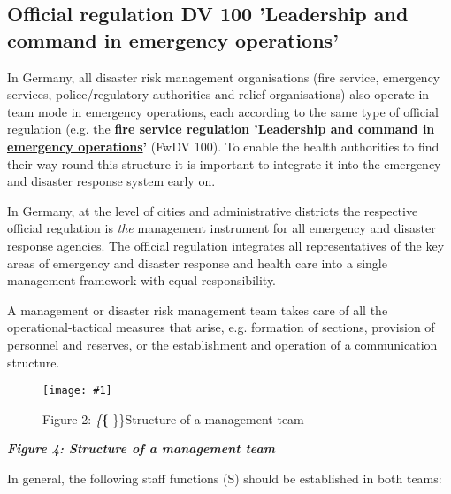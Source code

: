 \documentclass{article}
\newlength{\imgwidth}
\newcommand\scaledgraphics[2]{%
                
\settowidth{\imgwidth}{\texttt{[image: \#1]}}%
                
\setlength{\imgwidth}{\minof{\imgwidth}{#2\textwidth}}%
                
\texttt{[image: \#1]}%
                
}
\begin{document}
\subsection{Official regulation DV 100 'Leadership and command in emergency operations'}\label{H153399}



In Germany, all disaster risk management organisations (fire service, emergency services, police/regulatory authorities and relief organisations) also operate in team mode in emergency operations, each according to the same type of official regulation (e.g. the \textbf{\href{https://www.bbk.bund.de/SharedDocs/Downloads/BBK/DE/FIS/DownloadsRechtundVorschriften/Volltext_Fw_Dv/FwDV%20100.pdf}{fire service regulation 'Leadership and command in emergency operations}}\textbf{'} (FwDV 100). To enable the health authorities to find their way round this structure it is important to integrate it into the emergency and disaster response system early on.


In Germany, at the level of cities and administrative districts the respective official regulation is \emph{the} management instrument for all emergency and disaster response agencies. The official regulation integrates all representatives of the key areas of emergency and disaster response and health care into a single management framework with equal responsibility.


A management or disaster risk management team takes care of all the operational-tactical measures that arise, e.g. formation of sections, provision of personnel and reserves, or the establishment and operation of a communication structure.



\begin{figure}
\scaledgraphics{90bfad67-6e8a-4cc6-b7c8-76ac64997bf0.png}{1}
\caption*{Figure 2: \emph\{\textbf\{ \}\}Structure of a management team}\label{F75946271}
\end{figure}


\emph{\textbf{Figure 4: Structure of a management team}}


In general, the following staff functions (S) should be established in both teams:
\end{document}
